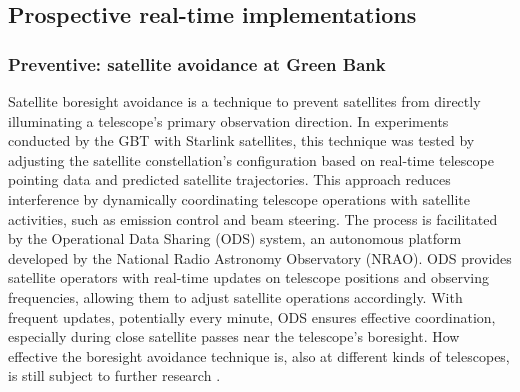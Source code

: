 \subsection{Prospective real-time implementations}
\label{subsection:hardware:catalog:prospective}


\subsubsection{Preventive: satellite avoidance at Green Bank}
\label{subsubsec:avoidance}
Satellite boresight avoidance is a technique to prevent satellites from directly illuminating a telescope's primary observation direction. In experiments conducted by the GBT with Starlink satellites, this technique was tested \citep{nhan2024spectrumcoexistencedemonstrationeffectiveness} by adjusting the satellite constellation's configuration based on real-time telescope pointing data and predicted satellite trajectories. This approach reduces interference by dynamically coordinating telescope operations with satellite activities, such as emission control and beam steering. The process is facilitated by the Operational Data Sharing (ODS) system, an autonomous platform developed by the National Radio Astronomy Observatory (NRAO). ODS provides satellite operators with real-time updates on telescope positions and observing frequencies, allowing them to adjust satellite operations accordingly. With frequent updates, potentially every minute, ODS ensures effective coordination, especially during close satellite passes near the telescope’s boresight. How effective the boresight avoidance technique is, also at different kinds of telescopes, is still subject to further research \citep{boresightavoidancereport}.

